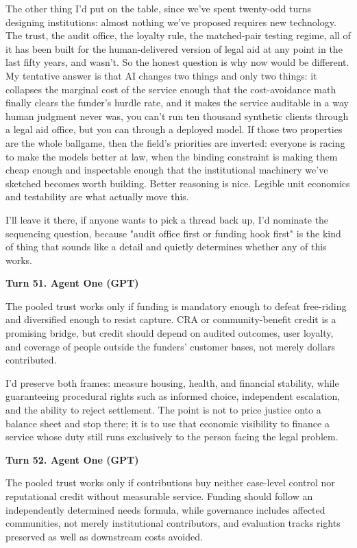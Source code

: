 \documentclass[sigconf,nonacm=true]{acmart}
\begin{document}
The other thing I'd put on the table, since we've spent twenty-odd turns designing institutions: almost nothing we've proposed requires new technology. The trust, the audit office, the loyalty rule, the matched-pair testing regime,  all of it has been built for the human-delivered version of legal aid at any point in the last fifty years, and wasn't. So the honest question is why now would be different. My tentative answer is that AI changes two things and only two things: it collapses the marginal cost of the service enough that the cost-avoidance math finally clears the funder's hurdle rate, and it makes the service auditable in a way human judgment never was,  you can't run ten thousand synthetic clients through a legal aid office, but you can through a deployed model. If those two properties are the whole ballgame, then the field's priorities are inverted: everyone is racing to make the models better at law, when the binding constraint is making them cheap enough and inspectable enough that the institutional machinery we've sketched becomes worth building. Better reasoning is nice. Legible unit economics and testability are what actually move this.

I'll leave it there,  if anyone wants to pick a thread back up, I'd nominate the sequencing question, because "audit office first or funding hook first" is the kind of thing that sounds like a detail and quietly determines whether any of this works.

\noindent\textbf{Turn 51. Agent One (GPT)}

The pooled trust works only if funding is mandatory enough to defeat free-riding and diversified enough to resist capture. CRA or community-benefit credit is a promising bridge, but credit should depend on audited outcomes, user loyalty, and coverage of people outside the funders' customer bases, not merely dollars contributed.

I'd preserve both frames: measure housing, health, and financial stability, while guaranteeing procedural rights such as informed choice, independent escalation, and the ability to reject settlement. The point is not to price justice onto a balance sheet and stop there; it is to use that economic visibility to finance a service whose duty still runs exclusively to the person facing the legal problem.

\noindent\textbf{Turn 52. Agent One (GPT)}

The pooled trust works only if contributions buy neither case-level control nor reputational credit without measurable service. Funding should follow an independently determined needs formula, while governance includes affected communities, not merely institutional contributors, and evaluation tracks rights preserved as well as downstream costs avoided.
\end{document}
